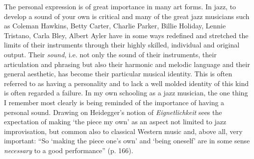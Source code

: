\documentclass[a4paper]{article}
\begin{document}
The personal expression is of great importance in many art forms. In jazz, to develop a sound of your own is critical and many of the great jazz musicians such as Coleman Hawkins, Betty Carter, Charlie Parker, Billie Holiday, Lennie Tristano, Carla Bley, Albert Ayler have in some ways redefined and stretched the limits of their instruments through their highly skilled, individual and original output. Their \emph{sound}, i.e. not only the sound of their instruments, their articulation and phrasing but also their harmonic and melodic language and their general aesthetic, has become their particular musical identity. This is often referred to as having a personality and to lack a well molded identity of this kind is often regarded a failure. In my own schooling as a jazz musician, the one thing I remember most clearly is being reminded of the importance of having a personal sound. Drawing on Heidegger's notion of \emph{Eignetlichkeit} \citet{benson03} sees the expectation of making `the piece my own' as an aspect not limited to jazz improvisation, but common also to classical Western music and, above all, very important: ``So `making the piece one's own' and `being oneself' are in some sense \emph{necessary} to a good performance'' (p. 166). 
\end{document}
